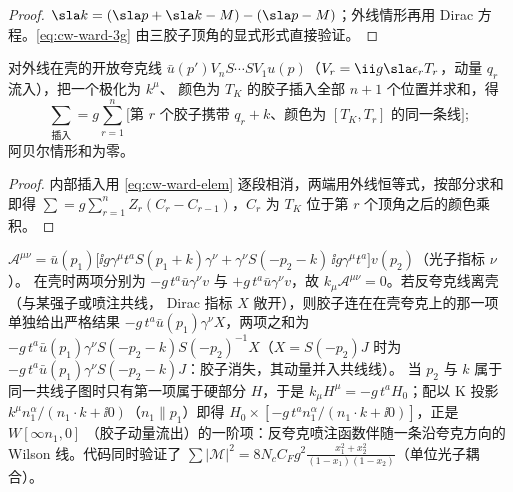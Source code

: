 \begin{proof}
$\sla k=(\sla p+\sla k-M)-(\sla p-M)$；外线情形再用 Dirac 方程。\cref{eq:cw-ward-3g} 由三胶子顶角的显式形式直接验证。
\end{proof}

\begin{proposition}\tagR\label{prop:cw-ward-line}
对外线在壳的开放夸克线 $\bar u(p')V_nS\cdots SV_1u(p)$（$V_r=\ii g\sla\epsilon_rT_r$，动量 $q_r$ 流入），把一个极化为 $k^\mu$、
颜色为 $T_K$ 的胶子插入全部 $n+1$ 个位置并求和，得
\begin{equation}\label{eq:cw-ward-line}
\sum_{\text{插入}}=g\sum_{r=1}^n\Big[\text{第 }r\text{ 个胶子携带 }q_r+k\text{、颜色为 }[T_K,T_r]\text{ 的同一条线}\Big];
\end{equation}
阿贝尔情形和为零。
\end{proposition}

\begin{proof}
内部插入用 \cref{eq:cw-ward-elem} 逐段相消，两端用外线恒等式，按部分求和即得
$\sum=g\sum_{r=1}^nZ_r(C_r-C_{r-1})$，$C_r$ 为 $T_K$ 位于第 $r$ 个顶角之后的颜色乘积。
\end{proof}

\begin{example}\label{ex:cw-qqg}
$\mathcal A^{\mu\nu}=\bar u(p_1)\big[\ii g\gamma^\mu t^aS(p_1+k)\gamma^\nu+\gamma^\nu S(-p_2-k)\,\ii g\gamma^\mu t^a\big]v(p_2)$（光子指标 $\nu$）。
在壳时两项分别为 $-g\,t^a\bar u\gamma^\nu v$ 与 $+g\,t^a\bar u\gamma^\nu v$，故 $k_\mu\mathcal A^{\mu\nu}=0$。若反夸克线离壳（与某强子或喷注共线，
Dirac 指标 $X$ 敞开），则胶子连在在壳夸克上的那一项单独给出严格结果 $-g\,t^a\bar u(p_1)\gamma^\nu X$，两项之和为
$-g\,t^a\bar u(p_1)\gamma^\nu S(-p_2-k)S(-p_2)^{-1}X$（$X=S(-p_2)J$ 时为 $-g\,t^a\bar u(p_1)\gamma^\nu S(-p_2-k)J$：胶子消失，其动量并入共线线）。
当 $p_2$ 与 $k$ 属于同一共线子图时只有第一项属于硬部分 $H$，于是 $k_\mu H^\mu=-g\,t^aH_0$；配以 K 投影
$k^\mu n_1^\alpha/(n_1\cdot k+\ii0)$（$n_1\parallel p_1$）即得 $H_0\times[-g\,t^an_1^\alpha/(n_1\cdot k+\ii0)]$，正是 $W[\infty n_1,0]$
（胶子动量流出）的一阶项：反夸克喷注函数伴随一条沿夸克方向的 Wilson 线。代码同时验证了
$\sum|\mathcal M|^2=8N_cC_Fg^2\frac{x_1^2+x_2^2}{(1-x_1)(1-x_2)}$（单位光子耦合）\cite{EllisStirlingWebber1996}。
\end{example}

